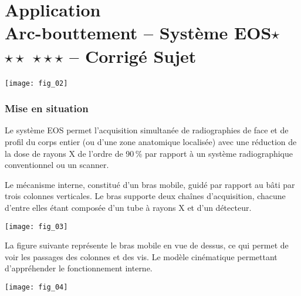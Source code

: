 \chapter*{Application  \\ 
Arc-bouttement -- Système EOS\ifnormal $\star$ \else \fi \ifdifficile $\star\star$ \else \fi \iftdifficile $\star\star\star$ \else \fi -- \ifprof Corrigé \else Sujet \fi}

\iflivret {} \else
\ifprof  {} \else \fi
\fi

\setcounter{question}{0}
%
\begin{marginfigure}
\texttt{[image: fig\_02]}
\end{marginfigure}

\subsection*{Mise en situation}
\ifprof
\else
Le système EOS permet l’acquisition simultanée de radiographies de face et de profil du corps entier (ou d’une zone anatomique localisée) avec une réduction de la dose de rayons X de l’ordre de 90\,\% par rapport à un système radiographique conventionnel ou un scanner.



Le mécanisme interne, constitué d’un bras mobile, guidé par rapport au bâti par trois colonnes
verticales. Le bras supporte deux chaînes d’acquisition, chacune d’entre elles étant composée d’un tube à rayons X et d’un détecteur.

\begin{marginfigure}
\texttt{[image: fig\_03]}
\end{marginfigure}


La figure suivante représente le bras mobile en vue de dessus, ce qui permet de voir les passages des colonnes et
des vis. Le modèle cinématique permettant d’appréhender le fonctionnement interne. 


\begin{marginfigure}
\texttt{[image: fig\_04]}
\end{marginfigure}





